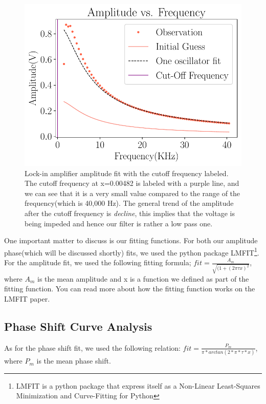 \documentclass[twocolumn]{article}\usepackage[english]{babel}
\begin{document}
\begin{figure}
\includegraphics[width=\linewidth]{images/v2/cutoff-fit.pdf}
\caption{Lock-in amplifier amplitude fit with the cutoff frequency labeled. The cutoff frequency at x=0.00482 is labeled with a purple line, and we can see that it is a very small value compared to the range of the frequency(which is 40,000 Hz). The general trend of the amplitude after the cutoff frequency is \textit{decline}, this implies that the voltage is being impeded and hence our filter is rather a low pass one. }
  \label{fig:CutOff LA Ampt fit}
\end{figure}
One important matter to discuss is our fitting functions. For both our amplitude phase(which will be discussed shortly) fits, we used the python package LMFIT\footnote{LMFIT is a python package that express itself as a Non-Linear Least-Squares Minimization and Curve-Fitting for Python}. For the amplitude fit, we used the following fitting formula;
\(fit = \frac{A_m}{\sqrt{(1+(2\pi\tau x)^2}}\), where $A_m$ is the mean amplitude and x is a function we defined as part of the fitting function. You can read more about how the fitting function works on the LMFIT paper\cite{2016ascl.soft06014N}. 
\subsection{Phase Shift Curve Analysis}
As for the phase shift fit, we used the following relation: \newline
\(fit = \frac{P_m}{\pi*arctan(2*\pi*\tau*x)}\), where $P_m$ is the mean phase shift.
\end{document}
